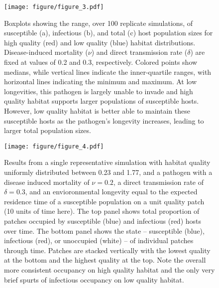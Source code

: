 \documentclass{article}
\begin{document}
\begin{figure}
\texttt{[image: figure/figure\_3.pdf]}
\centering
\caption{Boxplots showing the range, over 100 replicate simulations, of susceptible (a), infectious (b), and total (c) host population sizes for high quality (red) and low quality (blue) habitat distributions.  Disease-induced mortality ($\nu$) and direct transmission rate ($\delta$) are fixed at values of 0.2 and 0.3, respectively.  Colored points show medians, while vertical lines indicate the inner-quartile ranges, with horizontal lines indicating the minimum and maximum.  At low longevities, this pathogen is largely unable to invade and high quality habitat supports larger populations of susceptible hosts.  However, low quality habitat is better able to maintain these susceptible hosts as the pathogen's longevity increases, leading to larger total population sizes.}
\label{popsizes}
\end{figure}

\begin{figure}
\texttt{[image: figure/figure\_4.pdf]}
\centering
\caption{Results from a single representative simulation with habitat quality uniformly distributed between 0.23 and 1.77, and a pathogen with a disease induced mortality of $\nu = 0.2$, a direct transmission rate of $\delta = 0.3$, and an envioronmental longevity equal to the expected residence time of a susceptible population on a unit quality patch (10 units of time here).  The top panel shows total proportion of patches occupied by susceptible (blue) and infectious (red) hosts over time.  The bottom panel shows the state -- susceptible (blue), infectious (red), or unoccupied (white) -- of individual patches through time.  Patches are stacked vertically with the lowest quality at the bottom and the highest quality at the top.  Note the overall more consistent occupancy on high quality habitat and the only very brief spurts of infectious occupancy on low quality habitat.}
\label{simvis}
\end{figure}
\end{document}

